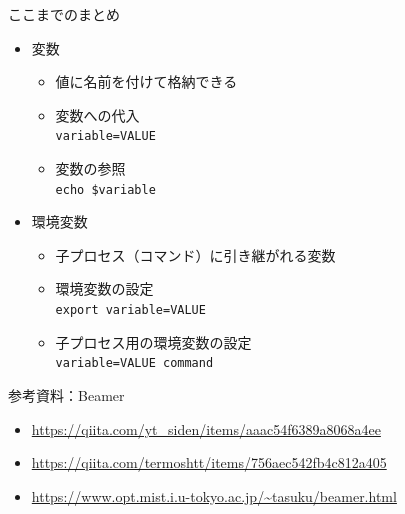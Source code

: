\documentclass[12pt,aspectratio=169]{beamer}
\begin{document}
\begin{frame}{ここまでのまとめ}
  \begin{itemize}
    \item 変数
      \begin{itemize}
        \item 値に名前を付けて格納できる
        \item 変数への代入 \\
              \texttt{variable=VALUE}
        \item 変数の参照 \\
              \texttt{echo \$variable}
      \end{itemize}
    \item 環境変数
      \begin{itemize}
        \item 子プロセス（コマンド）に引き継がれる変数
        \item 環境変数の設定 \\
              \texttt{export variable=VALUE}
        \item 子プロセス用の環境変数の設定 \\
              \texttt{variable=VALUE command}
      \end{itemize}

  \end{itemize}

\end{frame}

\begin{frame}{参考資料：Beamer}
  \begin{itemize}
    \item \url { https://qiita.com/yt_siden/items/aaac54f6389a8068a4ee }
    \item \url { https://qiita.com/termoshtt/items/756aec542fb4c812a405 }
    \item \url { https://www.opt.mist.i.u-tokyo.ac.jp/~tasuku/beamer.html }
  \end{itemize}

\end{frame}
\end{document}
